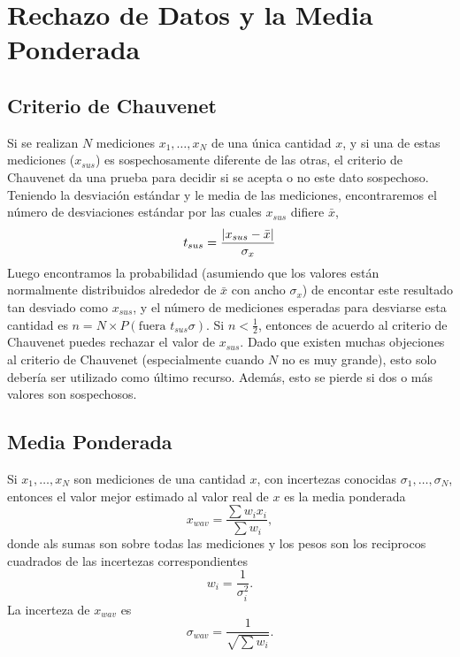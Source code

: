 \chapter{Rechazo de Datos y la Media Ponderada}

\section{Criterio de Chauvenet}
Si se realizan $N$ mediciones $x_1 ,\ldots ,x_N$ de una única cantidad $x$, y si una de estas mediciones ($x_{sus}$) es sospechosamente diferente de las otras, el criterio de Chauvenet da una prueba para decidir si se acepta o no este dato sospechoso. Teniendo la desviación estándar y le media de las mediciones, encontraremos el número de desviaciones estándar por las cuales $x_{sus}$ difiere $\bar{x}$,
	\begin{equation}
		t_{sus} = \frac{\abs{x_{sus} - \bar{x}}}{\sigma _x}
	\end{equation}
Luego encontramos la probabilidad (asumiendo que los valores están normalmente distribuidos alrededor de $\bar{x}$ con ancho $\sigma _x$) de encontar este resultado tan desviado como $x_{sus}$, y el número de mediciones esperadas para desviarse esta cantidad es $n = N \times P(\text{fuera } t_{sus} \sigma)$. Si $n< \frac{1}{2}$, entonces de acuerdo al criterio de Chauvenet puedes rechazar el valor de $x_{sus}$. Dado que existen muchas objeciones al criterio de Chauvenet (especialmente cuando $N$ no es muy grande), esto solo debería ser utilizado como último recurso. Además, esto se pierde  si dos o más valores son sospechosos.

\section{Media Ponderada}
Si $x_1 ,\ldots ,x_N$ son mediciones de una cantidad $x$, con incertezas conocidas $\sigma _1,\ldots ,\sigma _N$, entonces el valor mejor estimado al valor real de $x$ es la media ponderada
	\begin{equation}
		x_{wav} = \frac{\sum w_i x_i}{\sum w_i},
	\end{equation}
donde als sumas son sobre todas las mediciones y los pesos son los reciprocos cuadrados de las incertezas correspondientes
	\begin{equation}
		w_i = \frac{1}{\sigma _i ^2}.
	\end{equation}
La incerteza de $x_{wav}$ es
	\begin{equation}
		\sigma _{wav} = \frac{1}{\sqrt{\sum w_i}}.
	\end{equation}



